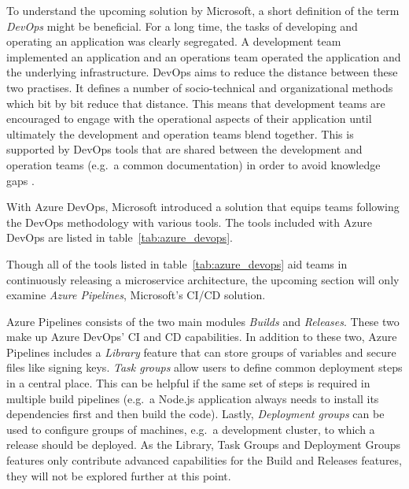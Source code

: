 To understand the upcoming solution by Microsoft, a short definition of the
term \textit{DevOps} might be beneficial. For a long time, the tasks of
developing and operating an application was clearly segregated. A development
team implemented an application and an operations team operated the application
and the underlying infrastructure. DevOps aims to reduce the distance between
these two practises. It defines a number of socio-technical and organizational
methods which bit by bit reduce that distance. This means that development
teams are encouraged to engage with the operational aspects of their
application until ultimately the development and operation teams blend
together. This is supported by DevOps tools that are shared between the
development and operation teams (e.g.\ a common documentation) in order to
avoid knowledge gaps \autocite{ArtacDevOpsIntroducingInfrastructure2017}.

With Azure DevOps, Microsoft introduced a solution that equips teams following
the DevOps methodology with various tools. The tools included with Azure DevOps
are listed in table~\ref{tab:azure_devops}.


Though all of the tools listed in table~\ref{tab:azure_devops} aid teams in
continuously releasing a microservice architecture, the upcoming section will
only examine \textit{Azure Pipelines}, Microsoft's \ac{CI}/\ac{CD} solution.

Azure Pipelines consists of the two main modules \textit{Builds} and
\textit{Releases}. These two make up Azure DevOps' \ac{CI} and \ac{CD}
capabilities. In addition to these two, Azure Pipelines includes a
\textit{Library} feature that can store groups of variables and secure files
like signing keys. \textit{Task groups} allow users to define common deployment
steps in a central place. This can be helpful if the same set of steps is
required in multiple build pipelines (e.g.\ a Node.js application always needs
to install its dependencies first and then build the code). Lastly,
\textit{Deployment groups} can be used to configure groups of machines, e.g.\ a
development cluster, to which a release should be deployed. As the Library,
Task Groups and Deployment Groups features only contribute advanced
capabilities for the Build and Releases features, they will not be explored
further at this point.

